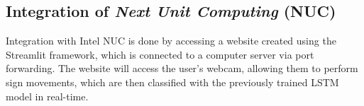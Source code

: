 \subsection{Integration of \emph{Next Unit Computing} (NUC)}
\label{subsec:integrasiNUC}

Integration with Intel NUC is done by accessing a website created using the Streamlit framework, which is connected to a computer server via port forwarding. The website will access the user's webcam, allowing them to perform sign movements, which are then classified with the previously trained LSTM model in real-time.












